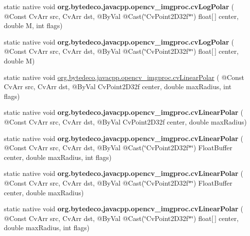 \begin{DoxyCompactItemize}
static native void {\bfseries org.\+bytedeco.\+javacpp.\+opencv\+\_\+imgproc.\+cv\+Log\+Polar} ( @Const Cv\+Arr src, Cv\+Arr dst, @By\+Val @Cast(\char`\"{}Cv\+Point2\+D32f$\ast$\char`\"{}) float\mbox{[}$\,$\mbox{]} center, double M, int flags)
\item 
\mbox{\label{group__imgproc__c_gae71d796f4d632a49d33324c61fe50141}} 
static native void {\bfseries org.\+bytedeco.\+javacpp.\+opencv\+\_\+imgproc.\+cv\+Log\+Polar} ( @Const Cv\+Arr src, Cv\+Arr dst, @By\+Val @Cast(\char`\"{}Cv\+Point2\+D32f$\ast$\char`\"{}) float\mbox{[}$\,$\mbox{]} center, double M)
\item 
static native void \hyperlink{group__imgproc__c_gaea7618f99d98e843a4bd01f403a4995e}{org.\+bytedeco.\+javacpp.\+opencv\+\_\+imgproc.\+cv\+Linear\+Polar} ( @Const Cv\+Arr src, Cv\+Arr dst, @By\+Val Cv\+Point2\+D32f center, double max\+Radius, int flags)
\item 
\mbox{\label{group__imgproc__c_ga1b7d96d40a37b98c6b3e4c95074f180d}} 
static native void {\bfseries org.\+bytedeco.\+javacpp.\+opencv\+\_\+imgproc.\+cv\+Linear\+Polar} ( @Const Cv\+Arr src, Cv\+Arr dst, @By\+Val Cv\+Point2\+D32f center, double max\+Radius)
\item 
\mbox{\label{group__imgproc__c_ga198ed56041015044be7b24000e141ee5}} 
static native void {\bfseries org.\+bytedeco.\+javacpp.\+opencv\+\_\+imgproc.\+cv\+Linear\+Polar} ( @Const Cv\+Arr src, Cv\+Arr dst, @By\+Val @Cast(\char`\"{}Cv\+Point2\+D32f$\ast$\char`\"{}) Float\+Buffer center, double max\+Radius, int flags)
\item 
\mbox{\label{group__imgproc__c_gaf06096f14fc630a7502d82f48b8360f8}} 
static native void {\bfseries org.\+bytedeco.\+javacpp.\+opencv\+\_\+imgproc.\+cv\+Linear\+Polar} ( @Const Cv\+Arr src, Cv\+Arr dst, @By\+Val @Cast(\char`\"{}Cv\+Point2\+D32f$\ast$\char`\"{}) Float\+Buffer center, double max\+Radius)
\item 
\mbox{\label{group__imgproc__c_ga0a2dec3572f036339353e6d9af567dc6}} 
static native void {\bfseries org.\+bytedeco.\+javacpp.\+opencv\+\_\+imgproc.\+cv\+Linear\+Polar} ( @Const Cv\+Arr src, Cv\+Arr dst, @By\+Val @Cast(\char`\"{}Cv\+Point2\+D32f$\ast$\char`\"{}) float\mbox{[}$\,$\mbox{]} center, double max\+Radius, int flags)

\end{DoxyCompactItemize}
